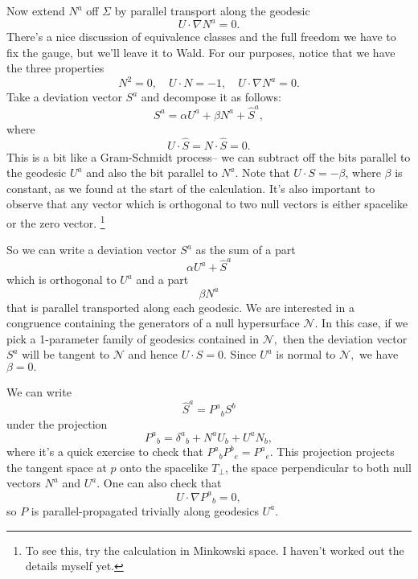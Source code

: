 Now extend $N^a$ off $\Sigma$ by parallel transport along the geodesic
\begin{equation}
    U\cdot \nabla N^a=0.
\end{equation}
There's a nice discussion of equivalence classes and the full freedom we have to fix the gauge, but we'll leave it to Wald. For our purposes, notice that we have the three properties
\begin{equation}
    N^2 = 0, \quad U\cdot N=-1,\quad U\cdot \nabla N^a=0.
\end{equation}
Take a deviation vector $S^a$ and decompose it as follows:
\begin{equation}
    S^a= \alpha U^a +\beta N^a + \hat S^a,
\end{equation}
where
\begin{equation}
    U\cdot \hat S = N\cdot \hat S=0.
\end{equation}
This is a bit like a Gram-Schmidt process-- we can subtract off the bits parallel to the geodesic $U^a$ and also the bit parallel to $N^a$.
Note that $U\cdot S=-\beta$, where $\beta$ is constant, as we found at the start of the calculation. It's also important to observe that any vector which is orthogonal to two null vectors is either spacelike or the zero vector.%
    \footnote{To see this, try the calculation in Minkowski space. I haven't worked out the details myself yet.}

So we can write a deviation vector $S^a$ as the sum of a part
\begin{equation*}
    \alpha U^a + \hat S^a
\end{equation*}
which is orthogonal to $U^a$ and a part
\begin{equation*}
    \beta N^a
\end{equation*}
that is parallel transported along each geodesic.
We are interested in a congruence containing the generators of a null hypersurface $\mathcal{N}$. In this case, if we pick a 1-parameter family of geodesics contained in $\mathcal{N},$ then the deviation vector $S^a$ will be tangent to $\mathcal{N}$ and hence $U\cdot S=0$. Since $U^a$ is normal to $\mathcal{N},$ we have $\beta=0.$

We can write
\begin{equation}
    \hat S^a = P^a{}_b S^b
\end{equation}
under the projection
\begin{equation}
    P^a{}_b = \delta^a{}_b + N^a U_b + U^a N_b,
\end{equation}
where it's a quick exercise to check that $P^a{}_b P^b{}_e = P^a{}_e.$ This projection projects the tangent space at $p$ onto the spacelike $T_\perp$, the space perpendicular to both null vectors $N^a$ and $U^a$.
One can also check that
\begin{equation}
    U\cdot \nabla P^a{}_b =0,
\end{equation}
so $P$ is parallel-propagated trivially along geodesics $U^a$.

